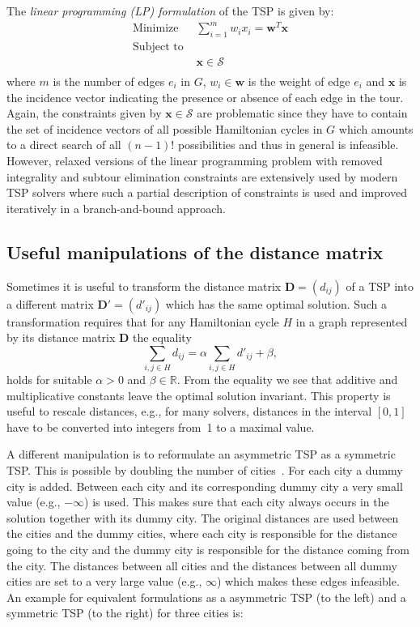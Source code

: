 \documentclass[10pt,a4paper,fleqn]{article}
\begin{document}
The \emph{linear programming (LP) formulation} of the TSP is given by:
\[
\begin{array}{rl}
    \text{Minimize }     & \sum_{i=1}^m{w_ix_i}  = \mathbf{w}^T\mathbf{x}\\[3mm] 
    \text{Subject to }   & \\
    & \mathbf{x} \in \mathcal{S} \\
\end{array}
\]
where $m$ is the number of edges $e_i$ in $G$, $w_i \in \mathbf{w}$ is the
weight of edge $e_i$ and $\mathbf{x}$ is the incidence vector indicating the
presence or absence of each edge in the tour. Again, the constraints given by
$\mathbf{x} \in \mathcal{S}$ are problematic since they have to contain the set
of incidence vectors of all possible Hamiltonian cycles in $G$ which amounts to
a direct search of all $(n-1)!$ possibilities and thus in general is
infeasible. However, relaxed versions of the linear programming problem with
removed integrality and subtour elimination constraints are extensively used by
modern TSP solvers where such a partial description of constraints is used and
improved iteratively in a branch-and-bound approach.

\subsection{Useful manipulations of the distance matrix}
\label{sec:manipulations}

Sometimes it is useful to transform the distance matrix $\mathbf{D} = (d_{ij})$
of a TSP into a different matrix $\mathbf{D'} = (d'_{ij})$ which has the same
optimal solution.  Such a transformation requires that for any
Hamiltonian cycle $H$ in a graph represented by its distance matrix $\mathbf{D}$
the equality
\begin{equation*}
\sum_{i,j \in H}{d_{ij}} = \alpha \sum_{i,j \in H}{d'_{ij}} + \beta,
\end{equation*}
holds for suitable $\alpha > 0$ and $\beta \in \mathbb{R}$.  From the
equality we see that additive and multiplicative constants leave the
optimal solution invariant. This property is useful to rescale
distances, e.g., for many solvers, distances in the interval $[0, 1]$
have to be converted into integers from~1 to a maximal value.

A different manipulation is to reformulate an asymmetric TSP as a symmetric TSP.
This is possible by doubling the number of cities~\citep{Jonker1983}. For each
city a dummy city is added. Between each city and its corresponding dummy city
a very small value (e.g., $-\infty$) is used.  This makes sure that each
city always occurs in the solution together with its dummy city. The original
distances are used between the cities and the dummy cities, where each city is
responsible for the distance going to the city and the dummy city is
responsible for the distance coming from the city. The distances between all
cities and the distances between all dummy cities are set to a very large
value (e.g., $\infty$) which makes these edges infeasible. An example for
equivalent formulations as a asymmetric TSP (to the left) and
a symmetric TSP (to the right) for
three cities is:
\end{document}

